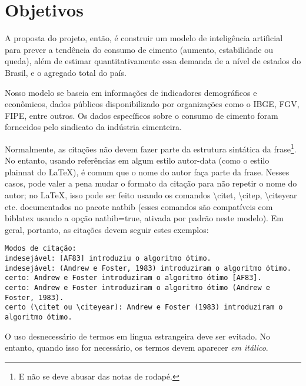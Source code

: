 \section*{Objetivos}


A proposta do projeto, então, é construir um modelo de inteligência artificial para prever a tendência do consumo de cimento (aumento, estabilidade ou queda), além de estimar quantitativamente essa demanda de a nível de estados do Brasil, e o agregado total do país.

Nosso modelo se baseia em informações de indicadores demográficos e econômicos, dados públicos disponibilizado por organizações como o IBGE, FGV, FIPE, entre outros. Os dados específicos sobre o consumo de cimento foram fornecidos pelo sindicato da indústria cimenteira.

\label{sec:consideracoes_preliminares}

Normalmente, as citações não devem fazer parte da estrutura sintática da
frase\footnote{E não se deve abusar das notas de rodapé.}.
No entanto, usando referências em algum estilo autor-data (como o estilo
plainnat do \LaTeX{}), é comum que o nome do autor faça parte da frase. Nesses
casos, pode valer a pena mudar o formato da citação para não repetir o nome do
autor; no \LaTeX{}, isso pode ser feito usando os comandos
\textsf{\textbackslash{}citet}, \textsf{\textbackslash{}citep},
\textsf{\textbackslash{}citeyear} etc. documentados no pacote
natbib \citep{natbib} (esses comandos são compatíveis com biblatex
usando a opção \textsf{natbib=true}, ativada por padrão neste modelo). Em geral,
portanto, as citações devem seguir estes exemplos:

\footnotesize
\begin{verbatim}
Modos de citação:
indesejável: [AF83] introduziu o algoritmo ótimo.
indesejável: (Andrew e Foster, 1983) introduziram o algoritmo ótimo.
certo: Andrew e Foster introduziram o algoritmo ótimo [AF83].
certo: Andrew e Foster introduziram o algoritmo ótimo (Andrew e Foster, 1983).
certo (\citet ou \citeyear): Andrew e Foster (1983) introduziram o algoritmo ótimo.
\end{verbatim}
\normalsize

\enlargethispage{.5\baselineskip}

O uso desnecessário de termos em língua estrangeira deve ser evitado. No entanto,
quando isso for necessário, os termos devem aparecer \textit{em itálico}.

